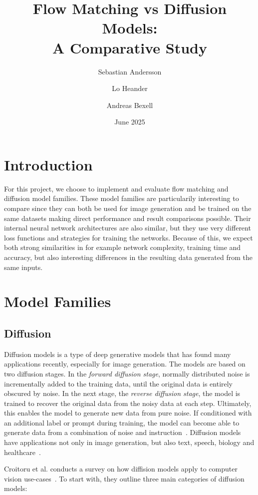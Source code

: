 \documentclass{article}
\title{Flow Matching vs Diffusion Models:\\ A Comparative Study}
\author{Sebastian Andersson \and Lo Heander \and Andreas Bexell}
\date{June 2025}
\begin{document}
\maketitle

\section{Introduction}

For this project, we choose to implement and evaluate flow matching and diffusion model families. These model families are particularily interesting to compare since they can both be used for image generation and be trained on the same datasets making direct performance and result comparisons possible. Their internal neural network architectures are also similar, but they use very different loss functions and strategies for training the networks. Because of this, we expect both strong similarities in for example network complexity, training time and accuracy, but also interesting differences in the resulting data generated from the same inputs.

\section{Model Families}

\subsection{Diffusion}

Diffusion models is a type of deep generative models that has found many applications recently, especially for image generation. The models are based on two diffusion stages. In the \emph{forward diffusion stage}, normally distributed noise is incrementally added to the training data, until the original data is entirely obscured by noise. In the next stage, the \emph{reverse diffusion stage}, the model is trained to recover the original data from the noisy data at each step. Ultimately, this enables the model to generate new data from pure noise. If conditioned with an additional label or prompt during training, the model can become able to generate data from a combination of noise and instruction~\cite{croitoru2023diffusion,yang2023diffusion}. Diffusion models have applications not only in image generation, but also text, speech, biology and healthcare~\cite{cao2024survey}.

Croitoru et al. conducts a survey on how diffision models apply to computer vision use-cases~\cite{croitoru2023diffusion}. To start with, they outline three main categories of diffusion models:
\end{document}
